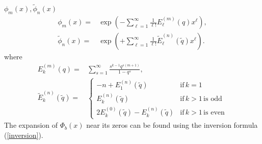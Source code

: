 \documentclass[a4paper,11pt]{article}
\theoremstyle{definition}
\def\tq{{\tilde{q}}}
\newcommand{\wt}[1]{\widetilde{#1}}
\begin{document}
$\phi_m(x),\wt{\phi}_n(x)$
\begin{equation}
  \begin{aligned}
    \phi_m(x) =
    &\exp\left(-\sum_{\ell=1}^\infty
      \frac{1}{\ell!}E_\ell^{(m)}(q)x^\ell\right),\\
    \wt{\phi}_n(x) =
    &\exp\left(+\sum_{\ell=1}^\infty
      \frac{1}{\ell!}\wt{E}_\ell^{(n)}(\tq)x^\ell \right).
  \end{aligned}
\end{equation}
where
\begin{equation}
  \begin{aligned}
    E_k^{(m)}(q) =
    &\sum_{s=1}^\infty \frac{s^{k-1}q^{s(m+1)}}{1-q^s},\\
    \wt{E}_k^{(n)}(\tq) =
    &
    \begin{cases}
      -n + E_1^{(n)}(\tq) &\text{if}\, k=1\\
      E_k^{(n)}(\tq) &\text{if}\, k>1 \,\text{is odd}\\
      2E_k^{(0)}(\tq) - E_k^{(n)}(\tq) &\text{if}\, k>1\,\text{is even}
    \end{cases}
  \end{aligned}
\end{equation}
The expansion of $\Phi_b(x)$ near its zeros can be found using the
inversion formula (\ref{inversion}). 
\end{document}
